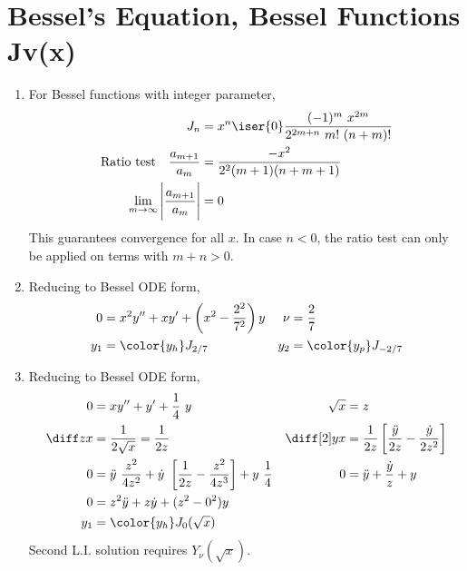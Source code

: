 \section{Bessel's Equation, Bessel Functions Jv(x)}
\begin{enumerate}
    \item For Bessel functions with integer parameter,
          \begin{align}
              J_n                               & = x^n \iser{0}\frac{(-1)^m\ x^{2m}}
              {2^{2m+n}\ m!\ (n+m)!}                                                  \\
              \text{Ratio test} \quad
              \frac{a_{m+1}}{a_m}               & = \frac{-x^2}{2^2(m+1)(n+m+1)}      \\
              \lim_{m \rightarrow \infty}
              \Bigg| \frac{a_{m+1}}{a_m} \Bigg| & = 0
          \end{align}
          This guarantees convergence for all $ x $. In case $ n < 0 $, the ratio
          test can only be applied on terms with $ m + n > 0  $.

    \item Reducing to Bessel ODE form,
          \begin{align}
              0   & = x^2y'' + xy' + \left( x^2 - \frac{2^2}{7^2} \right)y &
              \nu & = \frac{2}{7}                                            \\
              y_1 & = \color{y_h} J_{2/7}                                  &
              y_2 & = \color{y_p} J_{-2/7}
          \end{align}

    \item Reducing to Bessel ODE form,
          \begin{align}
              0                & = xy'' + y' + \frac{1}{4}\ y              &
              \sqrt{x}         & = z                                         \\
              \diff zx         & = \frac{1}{2\sqrt{x}} = \frac{1}{2z}      &
              \diff[2] yx      & = \frac{1}{2z} \left[ \frac{\ddot{y}}{2z}
              - \frac{\dot{y}}{2z^2} \right]                                 \\
              0                & = \ddot{y}\ \frac{z^2}{4z^2}
              + \dot{y}\ \left[\frac{1}{2z} - \frac{z^2}{4z^3}\right]
              + y\ \frac{1}{4} &
              0                & = \ddot{y} + \frac{\dot{y}}{z} + y          \\
              0                & = z^2 \ddot{y} + z\dot{y} + (z^2 - 0^2)y    \\
              y_1              & = \color{y_h} J_0(\sqrt{x})
          \end{align}
          Second L.I. solution requires $ Y_{\nu}(\sqrt{x}) $.


\end{enumerate}
